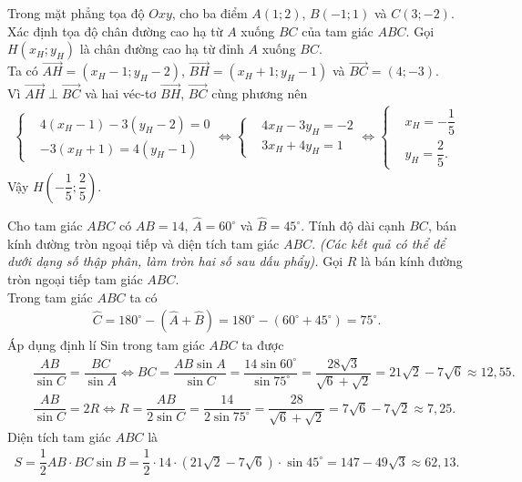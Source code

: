 \begin{bt}%
 Trong mặt phẳng tọa độ $Oxy$, cho ba điểm $A(1;2)$, $B(-1;1)$ và $C(3;-2)$. Xác định tọa độ chân đường cao hạ từ $A$ xuống $BC$ của tam giác $ABC$.
 \loigiai
  {
   Gọi $H(x_H;y_H)$ là chân đường cao hạ từ đỉnh $A$ xuống $BC$.\\
   Ta có $\overrightarrow{AH}=(x_H-1;y_H-2)$, $\overrightarrow{BH}=(x_H+1;y_H-1)$ và $\overrightarrow{BC}=(4;-3)$.\\
   Vì $\overrightarrow{AH}\perp \overrightarrow{BC}$ và hai véc-tơ $\overrightarrow{BH}$, $\overrightarrow{BC}$ cùng phương nên
   \begin{eqnarray*}
    \left\{\begin{aligned}&4(x_H-1)-3(y_H-2)=0 \\&-3(x_H+1)=4(y_H-1)\end{aligned}\right. \Leftrightarrow \left\{\begin{aligned}&4x_H-3y_H=-2 \\& 3x_H+4y_H=1\end{aligned}\right. \Leftrightarrow \left\{\begin{aligned}&x_H=-\dfrac{1}{5} \\&y_H=\dfrac{2}{5}.\end{aligned}\right.
   \end{eqnarray*}
   Vậy $H\left(-\dfrac{1}{5};\dfrac{2}{5}\right)$.
  }
\end{bt}

\begin{bt}%
 Cho tam giác $ABC$ có $AB=14$, $\widehat{A}=60^\circ$ và $\widehat{B}=45^\circ$. Tính độ dài cạnh $BC$, bán kính đường tròn ngoại tiếp và diện tích tam giác $ABC$. \textit{(Các kết quả có thể để dưới dạng số thập phân, làm tròn hai số sau dấu phẩy).}
 \loigiai
  {
  Gọi $R$ là bán kính đường tròn ngoại tiếp tam giác $ABC$.\\
  Trong tam giác $ABC$ ta có
  \begin{align*}
   \widehat{C}=180^\circ-\left(\widehat{A}+\widehat{B}\right)=180^\circ-\left(60^\circ+45^\circ\right)=75^\circ.
  \end{align*}
  Áp dụng định lí Sin trong tam giác $ABC$ ta được
  \allowdisplaybreaks
  \begin{eqnarray*}
   && \dfrac{AB}{\sin C}=\dfrac{BC}{\sin A} \Leftrightarrow BC=\dfrac{AB\sin A}{\sin C}=\dfrac{14\sin 60^\circ}{\sin 75^\circ}=\dfrac{28\sqrt{3}}{\sqrt{6}+\sqrt{2}}=21\sqrt{2}-7\sqrt{6}\approx 12{,}55.\\
   && \dfrac{AB}{\sin C}=2R \Leftrightarrow R=\dfrac{AB}{2\sin C}=\dfrac{14}{2\sin 75^\circ}=\dfrac{28}{\sqrt{6}+\sqrt{2}}=7\sqrt{6}-7\sqrt{2}\approx 7{,}25.
  \end{eqnarray*}
  Diện tích tam giác $ABC$ là
  \begin{align*}
   S=\dfrac{1}{2}AB\cdot BC\sin B = \dfrac{1}{2}\cdot 14\cdot\left(21\sqrt{2}-7\sqrt{6}\right)\cdot\sin 45^\circ=147-49\sqrt{3}\approx 62{,}13.
  \end{align*}
  }
\end{bt}

